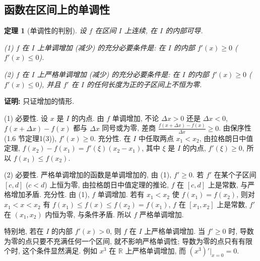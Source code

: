 \documentclass[UTF8,openany]{ctexbook}
\theoremstyle{chinesetextbook}
\newtheorem{theorem}{定理}[section]
\newenvironment{cnproof}{\par\indent\textbf{证明:} \ignorespaces}{\par}
\begin{document}
\subsection{函数在区间上的单调性}
\begin{theorem}[单调性的判别]\label{thm:c2-6-mono}
设 $f$ 在区间 $I$ 上连续, 在 $I$ 的内部可导.

\textup{(1)} $f$ 在 $I$ 上单调增加 (减少) 的充分必要条件是: 在 $I$ 的内部 $f'(x)\ge0$ ($f'(x)\le0$).

\textup{(2)} $f$ 在 $I$ 上严格单调增加 (减少) 的充分必要条件是: 在 $I$ 的内部 $f'(x)\ge0$ ($f'(x)\le0$), 并且 $f'$ 在 $I$ 的任何长度为正的子区间上不恒为零.
\end{theorem}
\begin{cnproof}
只证增加的情形.

(1) 必要性. 设 $x$ 是 $I$ 的内点. 由 $f$ 单调增加, 不论 $\Delta x>0$ 还是 $\Delta x<0$, $f(x+\Delta x)-f(x)$ 都与 $\Delta x$ 同号或为零, 差商 $\displaystyle\frac{f(x+\Delta x)-f(x)}{\Delta x}\ge0$. 由保序性 (1.6 节定理1(3)), $f'(x)\ge0$. 充分性. 在 $I$ 中任取两点 $x_1<x_2$, 由拉格朗日中值定理, $f(x_2)-f(x_1)=f'(\xi)(x_2-x_1)$, 其中 $\xi$ 是 $I$ 的内点, $f'(\xi)\ge0$, 所以 $f(x_1)\le f(x_2)$.

(2) 必要性. 严格单调增加的函数是单调增加的, 由 (1), $f'\ge0$. 若 $f'$ 在某个子区间 $[c,d]$ ($c<d$) 上恒为零, 由拉格朗日中值定理的推论, $f$ 在 $[c,d]$ 上是常数, 与严格增加矛盾. 充分性. 由 (1), $f$ 单调增加. 若有 $x_1<x_2$ 使 $f(x_1)=f(x_2)$, 则对 $x_1<x<x_2$ 有 $f(x_1)\le f(x)\le f(x_2)=f(x_1)$, $f$ 在 $[x_1,x_2]$ 上是常数, $f'$ 在 $(x_1,x_2)$ 内恒为零, 与条件矛盾. 所以 $f$ 严格单调增加.
\end{cnproof}
特别地, 若在 $I$ 的内部 $f'(x)>0$, 则 $f$ 在 $I$ 上严格单调增加. 当 $f'\ge0$ 时, 导数为零的点只要不充满任何一个区间, 就不影响严格单调性; 导数为零的点只有有限个时, 这个条件显然满足. 例如 $x^3$ 在 $\mathbb R$ 上严格单调增加, 而 $(x^3)'\big|_{x=0}=0$.
\end{document}
